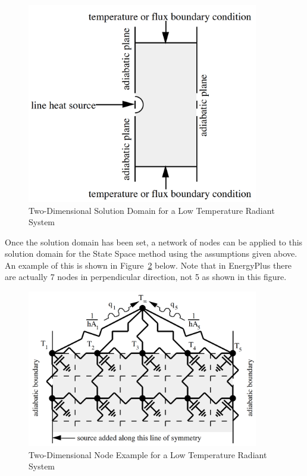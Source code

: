 \begin{figure}[hbtp] %
\centering
\includegraphics[width=0.9\textwidth, height=0.9\textheight, keepaspectratio=true]{media/RadSys2DSolutionSpace.png}
\caption{Two-Dimensional Solution Domain for a Low Temperature Radiant System \protect \label{fig:two-dimensional-solution-domain-for-a-low-temperature-radiant-system}}
\end{figure}

Once the solution domain has been set, a network of nodes can be applied to this solution domain for the State Space method using the assumptions given above.  An example of this is shown in Figure~\ref{fig:two-dimensional-node-example-for-a-low-temperature-radiant-system} below.  Note that in EnergyPlus there are actually 7 nodes in perpendicular direction, not 5 as shown in this figure.

\begin{figure}[hbtp] %
\centering
\includegraphics[width=0.9\textwidth, height=0.9\textheight, keepaspectratio=true]{media/RadSys2DNodeExample.png}
\caption{Two-Dimensional Node Example for a Low Temperature Radiant System \protect \label{fig:two-dimensional-node-example-for-a-low-temperature-radiant-system}}
\end{figure}

